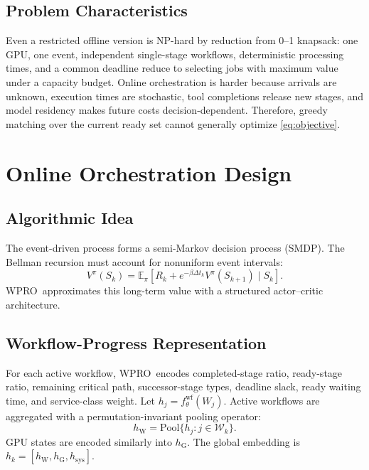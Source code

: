 \documentclass[10pt,conference]{IEEEtran}
\newcommand{\WPRO}{\textsc{WPRO}}
\newcommand{\calW}{\mathcal{W}}
\begin{document}
\subsection{Problem Characteristics}

Even a restricted offline version is NP-hard by reduction from 0--1 knapsack: one GPU, one event, independent single-stage workflows, deterministic processing times, and a common deadline reduce to selecting jobs with maximum value under a capacity budget. Online orchestration is harder because arrivals are unknown, execution times are stochastic, tool completions release new stages, and model residency makes future costs decision-dependent. Therefore, greedy matching over the current ready set cannot generally optimize \eqref{eq:objective}.

\section{Online Orchestration Design}

\subsection{Algorithmic Idea}

The event-driven process forms a semi-Markov decision process (SMDP). The Bellman recursion must account for nonuniform event intervals:
\begin{equation}
V^{\pi}(S_k)=
\mathbb{E}_{\pi}\left[
R_k+e^{-\beta\Delta t_k}V^{\pi}(S_{k+1})\mid S_k
\right].
\end{equation}
\WPRO\ approximates this long-term value with a structured actor--critic architecture.

\subsection{Workflow-Progress Representation}

For each active workflow, \WPRO\ encodes completed-stage ratio, ready-stage ratio, remaining critical path, successor-stage types, deadline slack, ready waiting time, and service-class weight. Let \(h_j=f_{\theta}^{\mathrm{wf}}(W_j)\). Active workflows are aggregated with a permutation-invariant pooling operator:
\begin{equation}
h_{\mathrm{W}}=\mathrm{Pool}\{h_j:j\in\calW_k\}.
\end{equation}
GPU states are encoded similarly into \(h_{\mathrm{G}}\). The global embedding is \(h_k=[h_{\mathrm{W}},h_{\mathrm{G}},h_{\mathrm{sys}}]\).
\end{document}
